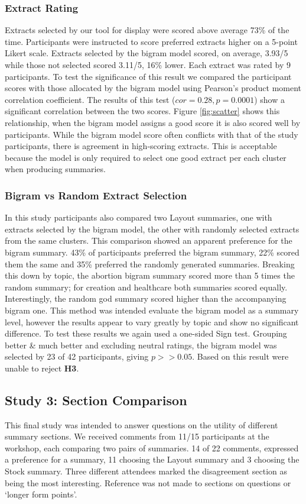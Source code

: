       \tocless\subsubsection{Extract Rating}
	      \noindent Extracts selected by our tool for display were scored above average 73\% of the time. Participants were instructed to score preferred extracts higher on a 5-point Likert scale. Extracts selected by the bigram model scored, on average, 3.93/5 while those not selected scored 3.11/5, 16\% lower. Each extract was rated by 9 participants. To test the significance of this result we compared the participant scores with those allocated by the bigram model using Pearson's product moment correlation coefficient. The results of this test ($cor = 0.28, p = 0.0001$) show a significant correlation between the two scores. Figure \ref{fig:scatter} shows this relationship, when the bigram model assigns a good score it is also scored well by participants. While the bigram model score often conflicts with that of the study participants, there is agreement in high-scoring extracts. This is acceptable because the model is only required to select one good extract per each cluster when producing summaries.

      \tocless\subsubsection{Bigram vs Random Extract Selection}
	      \noindent In this study participants also compared two Layout summaries, one with extracts selected by the bigram model, the other with randomly selected extracts from the same clusters. This comparison showed an apparent preference for the bigram summary. 43\% of participants preferred the bigram summary, 22\% scored them the same and 35\% preferred the randomly generated summaries. Breaking this down by topic, the abortion bigram summary scored more than 5 times the random summary; for creation and healthcare both summaries scored equally. Interestingly, the random god summary scored higher than the accompanying bigram one. This method was intended evaluate the bigram model as a summary level, however the results appear to vary greatly by topic and show no significant difference. To test these results we again used a one-sided Sign test. Grouping better \& much better and excluding neutral ratings, the bigram model was selected by 23 of 42 participants, giving $p >> 0.05$. Based on this result were unable to reject \textbf{H3}.

    \tocless\subsection{Study 3: Section Comparison}
      This final study was intended to answer questions on the utility of different summary sections. We received comments from 11/15 participants at the workshop, each comparing two pairs of summaries. 14 of 22 comments, expressed a preference for a summary, 11 choosing the Layout summary and 3 choosing the Stock summary. Three different attendees marked the disagreement section as being the most interesting. Reference was not made to sections on questions or `longer form points'.

